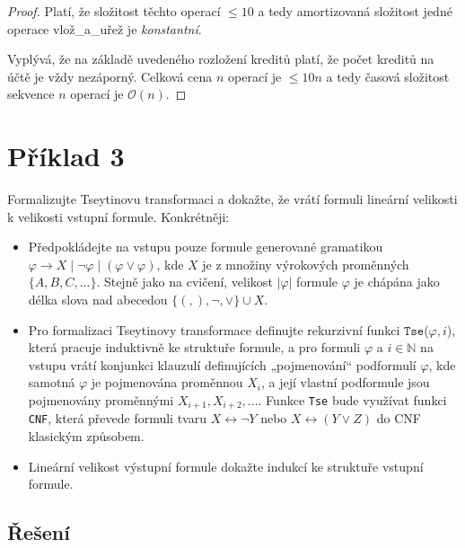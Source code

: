 \documentclass[a4paper, 12pt]{article}
\theoremstyle{definition}
\theoremstyle{definition}
\theoremstyle{definition}
\theoremstyle{remark}
\theoremstyle{remark}
\theoremstyle{remark}
\theoremstyle{remark}
\begin{document}
\begin{proof}
    Platí, že složitost těchto operací $\leq 10$ a tedy amortizovaná složitost jedné operace {\selectfont vlož\_a\_uřež} je \textit{konstantní}.

    Vyplývá, že na základě uvedeného rozložení kreditů platí, že počet kreditů na účtě je vždy nezáporný. Celková cena $n$ operací je $\leq 10n$ a tedy časová složitost sekvence $n$ operací je $\mathcal{O}(n)$.
    
   
\end{proof}

\section{Příklad 3}
Formalizujte Tseytinovu transformaci a dokažte, že vrátí formuli lineární velikosti k velikosti vstupní formule. Konkrétněji:

\begin{itemize}
    \item Předpokládejte na vstupu pouze formule generované gramatikou $\varphi \rightarrow X \; | \; \neg\varphi \; | \; (\varphi \lor \varphi)$, kde $X$ je z množiny výrokových proměnných $\{A, B, C, ...\}$. Stejně jako na cvičení, velikost $|\varphi|$ formule $\varphi$ je chápána jako délka slova nad abecedou $\{(, ), \neg, \lor\} \cup X$.
    \item Pro formalizaci Tseytinovy transformace definujte rekurzivní funkci $\texttt{Tse}$($\varphi, i$), která pracuje induktivně ke struktuře formule, a pro formuli $\varphi$ a $i \in \mathbb{N}$ na vstupu vrátí konjunkci klauzulí definujících „pojmenování“ podformulí $\varphi$, kde samotná $\varphi$ je pojmenována proměnnou $X_i$, a její vlastní podformule jsou pojmenovány proměnnými $X_{i+1}, X_{i+2}, ...$. Funkce \texttt{Tse} bude využívat funkci \texttt{CNF}, která převede formuli tvaru $X \leftrightarrow \neg Y$ nebo $X \leftrightarrow (Y \lor Z)$ do CNF klasickým způsobem.
    \item Lineární velikost výstupní formule dokažte indukcí ke struktuře vstupní formule.
\end{itemize}

\subsection{Řešení}
\end{document}
